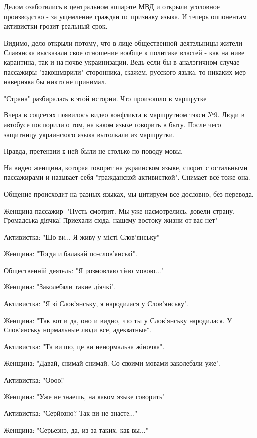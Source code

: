 Делом озаботились в центральном аппарате МВД и открыли уголовное производство - за ущемление граждан по признаку языка. И теперь оппонентам активистки грозит реальный срок. 

Видимо, дело открыли потому, что в лице общественной деятельницы жители Славянска высказали свое отношение вообще к политике властей - как на ниве карантина, так и на почве украинизации. Ведь если бы в аналогичном случае пассажиры "закошмарили" сторонника, скажем, русского языка, то никаких мер наверняка бы никто не принимал.

"Страна" разбиралась в этой истории.  
Что произошло в маршрутке

Вчера в соцсетях появилось видео конфликта в маршрутном такси №9. Люди в автобусе поспорили о том, на каком языке говорить в быту. После чего защитницу украинского языка вытолкали из маршрутки. 

Правда, претензии к ней были не столько по поводу мовы. 

На видео женщина, которая говорит на украинском языке, спорит с остальными пассажирами и называет себя "гражданской активисткой". Снимает всё тоже она. 

Общение происходит на разных языках, мы цитируем все дословно, без перевода. 

Женщина-пассажир: "Пусть смотрит. Мы уже насмотрелись, довели страну. Громадська діячка! Приехали сюда, нашему востоку жизни от вас нет"

Активистка: "Шо ви... Я живу у місті Слов’янську"

Женщина: "Тогда и балакай по-слов’янські". 

Общественній деятель: "Я розмовляю тією мовою..."

Женщина: "Заколебали такие діячкі". 

Активистка: "Я зі Слов’янську, я народилася у Слов’янську". 

Женщина: "Так вот и да, оно и видно, что ты у Слов’янську народилася. У Слов’янську нормальные люди все, адекватные". 

Активистка: "Та ви шо, це ви ненормальна жіночка". 

Женщина: "Давай, снимай-снимай. Со своими мовами заколебали уже". 

Активистка: "Оооо!"

Женщина: "Уже не знаешь, на каком языке говорить"

Активистка: "Серйозно? Так ви не знаєте..."

Женщина: "Серьезно, да, из-за таких, как вы..."

